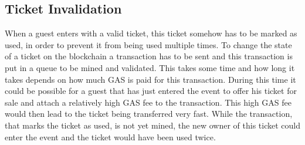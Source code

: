 
\subsection{Ticket Invalidation}\label{subsection:ticket-invalidation}

When a guest enters with a valid ticket, this ticket somehow has to be marked as used, in order to prevent it from being used multiple times. To change the state of a ticket on the blockchain a transaction has to be sent and this transaction is put in a queue to be mined and validated. This takes some time and how long it takes depends on how much GAS is paid for this transaction. During this time it could be possible for a guest that has just entered the event to offer his ticket for sale and attach a relatively high GAS fee to the transaction. This high GAS fee would then lead to the ticket being transferred very fast. While the transaction, that marks the ticket as used, is not yet mined, the new owner of this ticket could enter the event and the ticket would have been used twice.
